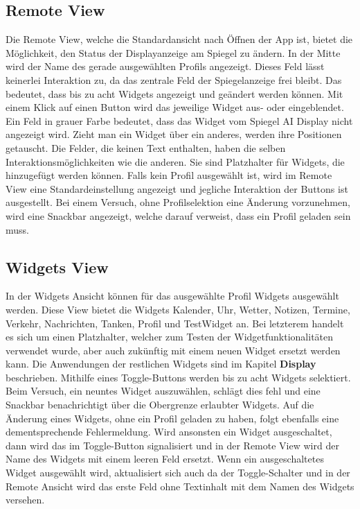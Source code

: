 \subsection{Remote View}
Die Remote View, welche die Standardansicht nach Öffnen der App ist, bietet die Möglichkeit, den Status der Displayanzeige am Spiegel zu ändern. In der Mitte wird der Name des gerade ausgewählten Profils angezeigt. Dieses Feld lässt keinerlei Interaktion zu, da das zentrale Feld der Spiegelanzeige frei bleibt. Das bedeutet, dass bis zu acht Widgets angezeigt und geändert werden können. Mit einem Klick auf einen Button wird das jeweilige Widget aus- oder eingeblendet. Ein Feld in grauer Farbe bedeutet, dass das Widget vom Spiegel AI Display nicht angezeigt wird. Zieht man ein Widget über ein anderes, werden ihre Positionen getauscht. Die Felder, die keinen Text enthalten, haben die selben Interaktionsmöglichkeiten wie die anderen. Sie sind Platzhalter für Widgets, die hinzugefügt werden können. Falls kein Profil ausgewählt ist, wird im Remote View eine Standardeinstellung angezeigt und jegliche Interaktion der Buttons ist ausgestellt. Bei einem Versuch, ohne Profilselektion eine Änderung vorzunehmen, wird eine Snackbar angezeigt, welche darauf verweist, dass ein Profil geladen sein muss.

\subsection{Widgets View}
In der Widgets Ansicht können für das ausgewählte Profil Widgets ausgewählt werden. Diese View bietet die Widgets Kalender, Uhr, Wetter, Notizen, Termine, Verkehr, Nachrichten, Tanken, Profil und TestWidget an. Bei letzterem handelt es sich um einen Platzhalter, welcher zum Testen der Widgetfunktionalitäten verwendet wurde, aber auch zukünftig mit einem neuen Widget ersetzt werden kann. Die Anwendungen der restlichen Widgets sind im Kapitel \textbf{Display} beschrieben. Mithilfe eines Toggle-Buttons werden bis zu acht Widgets selektiert. Beim Versuch, ein neuntes Widget auszuwählen, schlägt dies fehl und eine Snackbar benachrichtigt über die Obergrenze erlaubter Widgets. Auf die Änderung eines Widgets, ohne ein Profil geladen zu haben, folgt ebenfalls eine dementsprechende Fehlermeldung. Wird ansonsten ein Widget ausgeschaltet, dann wird das im Toggle-Button signalisiert und in der Remote View wird der Name des Widgets mit einem leeren Feld ersetzt. Wenn ein ausgeschaltetes Widget ausgewählt wird, aktualisiert sich auch da der Toggle-Schalter und in der Remote Ansicht wird das erste Feld ohne Textinhalt mit dem Namen des Widgets versehen.

